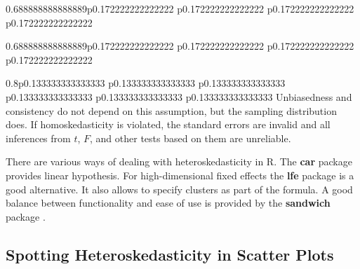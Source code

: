 \documentclass[]{book}
\newenvironment{Shaded}{\begin{snugshade}}{\end{snugshade}}
\newcommand{\DataTypeTok}[1]{\textcolor[rgb]{0.13,0.29,0.53}{#1}}
\newcommand{\KeywordTok}[1]{\textcolor[rgb]{0.13,0.29,0.53}{\textbf{#1}}}
\newcommand{\NormalTok}[1]{#1}
\newcommand{\OperatorTok}[1]{\textcolor[rgb]{0.81,0.36,0.00}{\textbf{#1}}}
\newcommand{\StringTok}[1]{\textcolor[rgb]{0.31,0.60,0.02}{#1}}
\begin{document}
\begin{tabularx}{0.688888888888889\textwidth}{p{} p{} p{} p{}}
\begin{tabularx}{0.688888888888889\textwidth}{p{} p{} p{} p{}}
\begin{tabularx}{0.8\textwidth}{p{} p{} p{} p{} p{} p{}}
Unbiasedness and consistency do not depend on this assumption, but the
sampling distribution does. If homoskedasticity is violated, the
standard errors are invalid and all inferences from \(t\), \(F\), and
other tests based on them are unreliable.

There are various ways of dealing with heteroskedasticity in R. The
\textbf{car} package provides linear hypothesis. For high-dimensional
fixed effects the \textbf{lfe} package is a good alternative. It also
allows to specify clusters as part of the formula. A good balance
between functionality and ease of use is provided by the
\textbf{sandwich} package \citet{Zeileis2017}.

\hypertarget{spotting-heteroskedasticity-in-scatter-plots}{%
\subsection{Spotting Heteroskedasticity in Scatter
Plots}\label{spotting-heteroskedasticity-in-scatter-plots}}

\begin{Shaded}
\end{Shaded}

\begin{figure}


\end{figure}
\end{tabularx}
\end{tabularx}
\end{tabularx}
\end{document}
